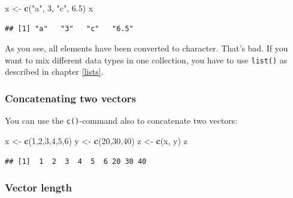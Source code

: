\documentclass[
]{scrartcl}
\newenvironment{Shaded}{\begin{snugshade}}{\end{snugshade}}
\newcommand{\DecValTok}[1]{\textcolor[rgb]{0.00,0.00,0.81}{#1}}
\newcommand{\FloatTok}[1]{\textcolor[rgb]{0.00,0.00,0.81}{#1}}
\newcommand{\KeywordTok}[1]{\textcolor[rgb]{0.13,0.29,0.53}{\textbf{#1}}}
\newcommand{\NormalTok}[1]{#1}
\newcommand{\StringTok}[1]{\textcolor[rgb]{0.31,0.60,0.02}{#1}}
\begin{document}
\begin{Shaded}
\begin{Highlighting}[]
\NormalTok{x \textless{}{-}}\StringTok{ }\KeywordTok{c}\NormalTok{(}\StringTok{"a"}\NormalTok{, }\DecValTok{3}\NormalTok{, }\StringTok{"c"}\NormalTok{, }\FloatTok{6.5}\NormalTok{)}
\NormalTok{x}
\end{Highlighting}
\end{Shaded}

\begin{verbatim}
## [1] "a"   "3"   "c"   "6.5"
\end{verbatim}

As you see, all elements have been converted to character. That's bad. If you want to mix different data types in one collection, you have to use \texttt{list()} as described in chapter \ref{lists}.

\hypertarget{concatenating-two-vectors}{%
\subsubsection*{Concatenating two vectors}\label{concatenating-two-vectors}}

You can use the \texttt{c()}-command also to concatenate two vectors:

\begin{Shaded}
\begin{Highlighting}[]
\NormalTok{x \textless{}{-}}\StringTok{ }\KeywordTok{c}\NormalTok{(}\DecValTok{1}\NormalTok{,}\DecValTok{2}\NormalTok{,}\DecValTok{3}\NormalTok{,}\DecValTok{4}\NormalTok{,}\DecValTok{5}\NormalTok{,}\DecValTok{6}\NormalTok{)}
\NormalTok{y \textless{}{-}}\StringTok{ }\KeywordTok{c}\NormalTok{(}\DecValTok{20}\NormalTok{,}\DecValTok{30}\NormalTok{,}\DecValTok{40}\NormalTok{)}
\NormalTok{z \textless{}{-}}\StringTok{ }\KeywordTok{c}\NormalTok{(x, y)}
\NormalTok{z}
\end{Highlighting}
\end{Shaded}

\begin{verbatim}
## [1]  1  2  3  4  5  6 20 30 40
\end{verbatim}

\hypertarget{vector-length}{%
\subsubsection*{Vector length}\label{vector-length}}
\end{document}
